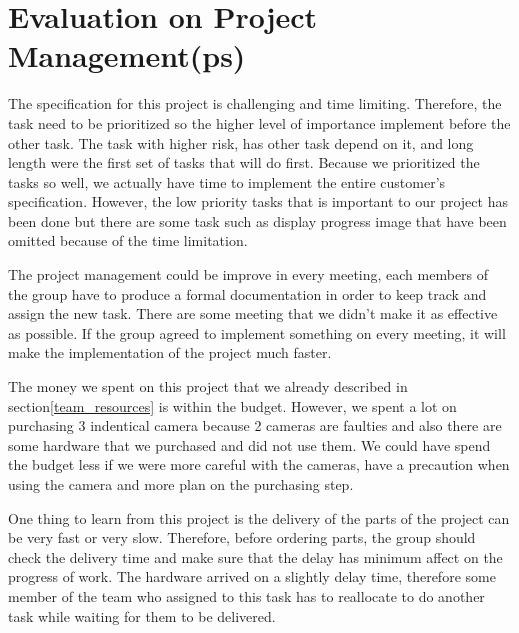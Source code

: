 \section{Evaluation on Project Management(ps)}

The specification for this project is challenging and time limiting.
Therefore, the task need to be prioritized so the higher level of importance implement before the other task.
The task with higher risk, has other task depend on it, and long length were the first set of tasks that will do first.
Because we prioritized the tasks so well, we actually have time to implement the entire customer's specification.
However, the low priority tasks that is important to our project has been done but there are some task such as display progress image that have been omitted because of the time limitation.

The project management could be improve in every meeting, each members of the group have to produce a formal documentation in order to keep track and assign the new task.
There are some meeting that we didn't make it as effective as possible.
If the group agreed to implement something on every meeting, it will make the implementation of the project much faster. 

The money we spent on this project that we already described in section\ref{team_resources} is within the budget.
However, we spent a lot on purchasing 3 indentical camera because 2 cameras are faulties and also there are some hardware that we purchased and did not use them.
We could have spend the budget less if we were more careful with the cameras, have a precaution when using the camera and more plan on the purchasing step.

One thing to learn from this project is the delivery of the parts of the project can be very fast or very slow. 
Therefore, before ordering parts, the group should check the delivery time and make sure that the delay has minimum affect on the progress of work.
The hardware arrived on a slightly delay time, therefore some member of the team who assigned to this task has to reallocate to do another task while waiting for them to be delivered.













